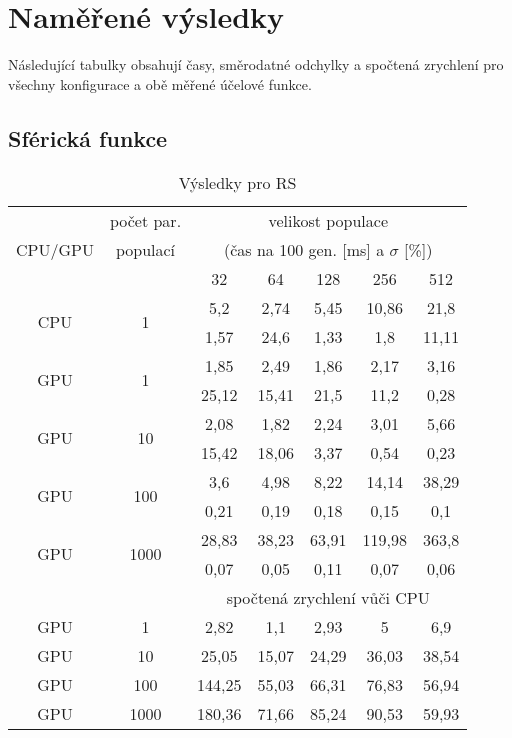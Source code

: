 \chapter{Naměřené výsledky}

Následující tabulky obsahují časy, směrodatné odchylky a spočtená zrychlení pro všechny konfigurace a obě měřené účelové funkce.

\section{Sférická funkce}

\begin{table}[h!]
    \begin{center}
    \begin{tabular}{ccccccc}
      \toprule
      \midrule
      \multirow{3}{*}{CPU/GPU} & počet par. & \multicolumn{5}{c}{velikost populace} \\
      & populací & \multicolumn{5}{c}{(čas na 100 gen. [ms] a $\sigma$ [\%])} \\
      & & 32 & 64 & 128 & 256 & 512 \\
      \midrule
      \multirow{2}{*}{CPU} & \multirow{2}{*}{1}
&5,2&2,74&5,45&10,86&21,8\\
&&1,57&24,6&1,33&1,8&11,11\vspace{1.5mm}\\
\multirow{2}{*}{GPU} & \multirow{2}{*}{1}
&1,85&2,49&1,86&2,17&3,16\\
&&25,12&15,41&21,5&11,2&0,28\vspace{1.5mm}\\
\multirow{2}{*}{GPU} & \multirow{2}{*}{10}
&2,08&1,82&2,24&3,01&5,66\\
&&15,42&18,06&3,37&0,54&0,23\vspace{1.5mm}\\
\multirow{2}{*}{GPU} & \multirow{2}{*}{100}
&3,6&4,98&8,22&14,14&38,29\\
&&0,21&0,19&0,18&0,15&0,1\vspace{1.5mm}\\
\multirow{2}{*}{GPU} & \multirow{2}{*}{1000}
&28,83&38,23&63,91&119,98&363,8\\
&&0,07&0,05&0,11&0,07&0,06\\
\midrule
      & & \multicolumn{5}{c}{spočtená zrychlení vůči CPU} \\
\midrule
      GPU & 1
&2,82&1,1&2,93&5&6,9\\
GPU & 10
&25,05&15,07&24,29&36,03&38,54\\
GPU & 100
&144,25&55,03&66,31&76,83&56,94\\
GPU & 1000
&180,36&71,66&85,24&90,53&59,93\\
      \midrule
      \bottomrule
    \end{tabular}
    \caption{Výsledky pro RS}
    \end{center}
\end{table}
\clearpage

